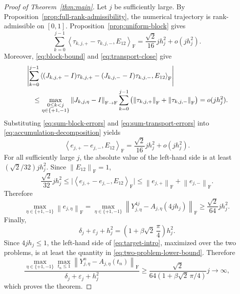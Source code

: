 \documentclass[10pt,a4paper]{amsart}
\numberwithin{equation}{section}
\newcommand{\F}{\mathrm F}
\newcommand{\norm}[1]{\left\lVert #1\right\rVert}
\newcommand{\ip}[2]{\left\langle #1,#2\right\rangle_{\F}}
\newcommand{\eps}{\varepsilon}
\begin{document}
\begin{proof}[Proof of Theorem~\ref{thm:main}]
Let $j$ be sufficiently large.  By
Proposition~\ref{prop:full-rank-admissibility}, the numerical trajectory
is rank-admissible on $[0,1]$.  Proposition~\ref{prop:uniform-block}
gives
\begin{equation}\label{eq:sum-block-errors}
 \sum_{k=0}^{j-1}
 \ip{\tau_{k,j,+}-\tau_{k,j,-}}{E_{12}}
 =\frac{\sqrt2}{16}jh_j^2+o(jh_j^2).
\end{equation}
Moreover, \eqref{eq:block-bound} and \eqref{eq:transport-close} give
\begin{align}
 &\left|\sum_{k=0}^{j-1}
 \ip{(J_{k,j,+}-I)\tau_{k,j,+}
 -(J_{k,j,-}-I)\tau_{k,j,-}}{E_{12}}\right|\notag\\
 &\quad\le
 \max_{\substack{0\le k<j\\ \eta\in\{+1,-1\}}}
 \norm{J_{k,j,\eta}-I}_{\F\to\F}
 \sum_{k=0}^{j-1}
 \left(\norm{\tau_{k,j,+}}_{\F}+\norm{\tau_{k,j,-}}_{\F}\right)
 =o(jh_j^2).
 \label{eq:sum-transport-errors}
\end{align}
Substituting \eqref{eq:sum-block-errors} and
\eqref{eq:sum-transport-errors} into
\eqref{eq:accumulation-decomposition} yields
\begin{equation}\label{eq:accumulated}
 \ip{e_{j,+}-e_{j,-}}{E_{12}}
 =\frac{\sqrt2}{16}jh_j^2+o(jh_j^2).
\end{equation}
For all sufficiently large $j$, the absolute value of the left-hand
side is at least $(\sqrt2/32)jh_j^2$.  Since $\norm{E_{12}}_{\F}=1$,
\begin{equation*}
 \frac{\sqrt2}{32}jh_j^2
 \le\bigl|\ip{e_{j,+}-e_{j,-}}{E_{12}}\bigr|
 \le\norm{e_{j,+}}_{\F}+\norm{e_{j,-}}_{\F}.
\end{equation*}
Therefore
\begin{equation}\label{eq:two-problem-lower-bound}
 \max_{\eta\in\{+1,-1\}}\norm{e_{j,\eta}}_{\F}
 =\max_{\eta\in\{+1,-1\}}
 \norm{Y_{j,\eta}^{4j}-A_{j,\eta}(4jh_j)}_{\F}
 \ge\frac{\sqrt2}{64}jh_j^2.
\end{equation}
Finally,
\[
 \delta_j+\eps_j+h_j^2
 =\left(1+\beta\sqrt2\,\frac\pi4\right)h_j^2.
\]
Since $4jh_j\le1$, the left-hand side of
\eqref{eq:target-intro}, maximized over the two problems, is at least
the quantity in \eqref{eq:two-problem-lower-bound}.  Therefore
\begin{equation*}
 \frac{
  \displaystyle\max_{\eta\in\{+1,-1\}}\max_{t_n\le1}
  \norm{Y_{j,\eta}^n-A_{j,\eta}(t_n)}_{\F}}
 {\delta_j+\eps_j+h_j^2}
 \ge
 \frac{\sqrt2}{64(1+\beta\sqrt2\,\pi/4)}j
 \longrightarrow\infty,
\end{equation*}
which proves the theorem.
\end{proof}
\end{document}
